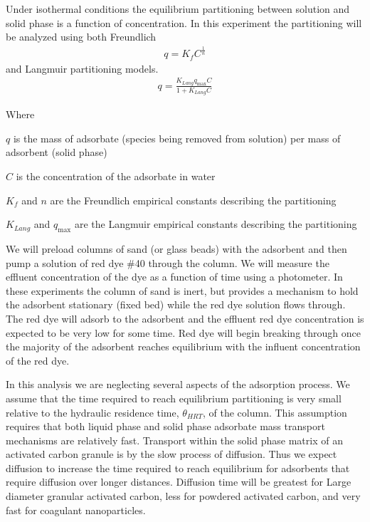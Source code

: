 \documentclass[letterpaper,10pt,english]{sphinxmanual}
\begin{document}
Under isothermal conditions the equilibrium partitioning between solution and solid phase is a function of concentration. In this experiment the partitioning will be analyzed using both Freundlich
\begin{equation}\label{equation:Adsorption/Adsorption:Freundlich}
\begin{split}q =K_f C^{\frac{1}{n}}\end{split}
\end{equation}
and Langmuir partitioning models.
\begin{equation}\label{equation:Adsorption/Adsorption:Langmuir}
\begin{split}q =\frac{K_{Lang}q_{\max} C}{1+K_{Lang}C}\end{split}
\end{equation}
\begin{DUlineblock}{0em}
\item[] Where
\item[] \(q\) is the mass of adsorbate (species being removed from solution) per mass of adsorbent (solid phase)
\item[] \(C\) is the concentration of the adsorbate in water
\item[] \(K_f\) and \(n\) are the Freundlich empirical constants describing the partitioning
\item[] \(K_{Lang}\) and \(q_{\max}\) are the Langmuir empirical constants describing the partitioning
\end{DUlineblock}

We will preload columns of sand (or glass beads) with the adsorbent and then pump a solution of red dye \#40 through the column. We will measure the effluent concentration of the dye as a function of time using a photometer. In these experiments the column of sand is inert, but provides a mechanism to hold the adsorbent stationary (fixed bed) while the red dye solution flows through. The red dye will adsorb to the adsorbent and the effluent red dye concentration is expected to be very low for some time. Red dye will begin breaking through once the majority of the adsorbent reaches equilibrium with the influent concentration of the red dye.

In this analysis we are neglecting several aspects of the adsorption process. We assume that the time required to reach equilibrium partitioning is very small relative to the hydraulic residence time, \(\theta_{HRT}\), of the column. This assumption requires that both liquid phase and solid phase adsorbate mass transport mechanisms are relatively fast. Transport within the solid phase matrix of an activated carbon granule is by the slow process of diffusion. Thus we expect diffusion to increase the time required to reach equilibrium for adsorbents that require diffusion over longer distances. Diffusion time will be greatest for Large diameter granular activated carbon, less for powdered activated carbon, and very fast for coagulant nanoparticles.
\end{document}
